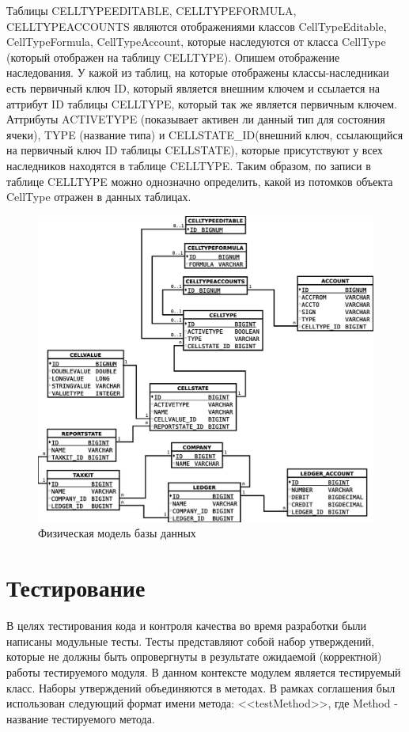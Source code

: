 \documentclass[14pt,a4paper]{reportmod}
\begin{document}
Таблицы CELLTYPEEDITABLE, CELLTYPEFORMULA, \\CELLTYPEACCOUNTS являются отображениями классов CellTypeEditable, CellTypeFormula, CellTypeAccount, которые наследуются от класса CellType (который отображен на таблицу CELLTYPE). Опишем отображение наследования. У кажой из таблиц, на которые отображены классы-наследникаи есть первичный ключ ID, который является внешним ключем и ссылается на аттрибут ID таблицы CELLTYPE, который так же является первичным ключем. Аттрибуты ACTIVETYPE (показывает активен ли данный тип для состояния ячеки), TYPE (название типа) и CELLSTATE\_ID(внешний ключ, ссылающийся на первичный ключ ID таблицы CELLSTATE), которые присутствуют у всех наследников находятся в таблице CELLTYPE. Таким образом, по записи в таблице CELLTYPE можно однозначно определить, какой из потомков объекта CellType отражен в данных таблицах.
\begin{figure}[ht]
  \centering
  \includegraphics[scale=0.4]{uml/database}
  \caption{Физическая модель базы данных}
  \label{pic:database}
\end{figure}

\section{Тестирование}
В целях тестирования кода и контроля качества во время разработки были написаны модульные тесты. Тесты представляют собой набор утверждений, которые не должны быть опровергнуты в результате ожидаемой (корректной) работы тестируемого модуля. В данном контексте модулем является тестируемый класс. Наборы утверждений объединяются в методах. В рамках соглашения был использован следующий формат имени метода: <<testMethod>>, где Method - название тестируемого метода.
\end{document}
